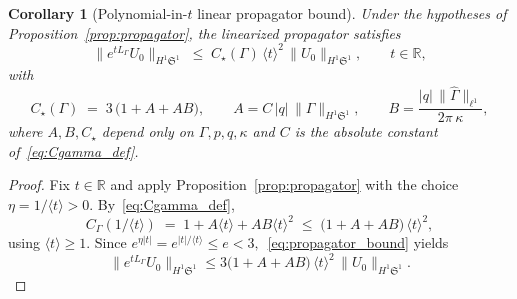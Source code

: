 \documentclass[11pt]{amsart}
\newtheorem{corollary}[theorem]{Corollary}
\theoremstyle{definition}
\newtheorem{remark}[theorem]{Remark}
\newcommand{\R}{\mathbb{R}}
\newcommand{\Sp}{\mathfrak{S}}
\begin{document}
\begin{corollary}[Polynomial-in-$t$ linear propagator bound]
\label{cor:poly_propagator}
Under the hypotheses of Proposition~\ref{prop:propagator}, the linearized propagator satisfies
\begin{equation}\label{eq:poly_propagator_bound}
  \|e^{tL_\Gamma}U_0\|_{H^1\Sp^1}
  \;\le\; C_\star(\Gamma)\,
  \langle t\rangle^2\,
  \|U_0\|_{H^1\Sp^1},
  \qquad t\in\R,
\end{equation}
with
\begin{equation}\label{eq:Cstar_def}
  C_\star(\Gamma)\;=\;3\,\bigl(1+A+AB\bigr),
  \qquad
  A=C\,|q|\,\|\Gamma\|_{H^1\Sp^1},
  \qquad
  B=\frac{|q|\,\|\hat\Gamma\|_{\ell^1}}{2\pi\,\kappa},
\end{equation}
where $A,B,C_\star$ depend only on $\Gamma,p,q,\kappa$ and $C$ is the absolute constant of~\eqref{eq:Cgamma_def}.
\end{corollary}

\begin{proof}
Fix $t\in\R$ and apply Proposition~\ref{prop:propagator} with the choice $\eta=1/\langle t\rangle>0$. By~\eqref{eq:Cgamma_def},
\[
  C_\Gamma(1/\langle t\rangle)
  \;=\; 1+A\langle t\rangle+AB\langle t\rangle^2
  \;\le\; \bigl(1+A+AB\bigr)\,\langle t\rangle^2,
\]
using $\langle t\rangle\ge 1$. Since $e^{\eta|t|}=e^{|t|/\langle t\rangle}\le e<3,$~\eqref{eq:propagator_bound} yields
\[
  \|e^{tL_\Gamma}U_0\|_{H^1\Sp^1}
  \le 3\bigl(1+A+AB\bigr)\,
  \langle t\rangle^2\,
  \|U_0\|_{H^1\Sp^1}.
\]
\end{proof}

\end{document}
